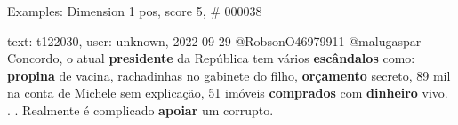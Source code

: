 \begin{frame}{Examples: Dimension 1 pos, score 5, \# 000038}
\footnotesize
\begin{exampleblock}{text: t122030, user: unknown, 2022-09-29}
@RobsonO46979911 @malugaspar Concordo, o atual \textbf{presidente} da República 
tem vários \textbf{escândalos} como: \textbf{propina} de vacina, rachadinhas no 
gabinete do filho, \textbf{orçamento} secreto, 89 mil na conta de Michele sem 
explicação, 51 imóveis \textbf{comprados} com \textbf{dinheiro} vivo. . . 
Realmente é complicado \textbf{apoiar} um corrupto. 
\end{exampleblock}
\end{frame}
